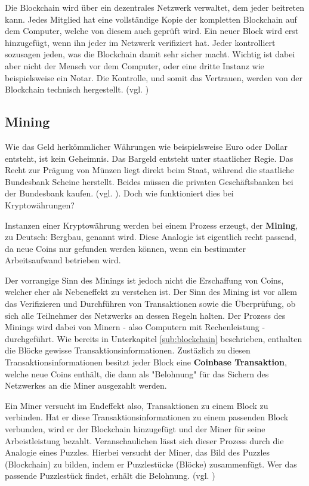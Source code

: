 \documentclass[oneside]{ausarbeitung}
\begin{document}
Die Blockchain wird über ein dezentrales Netzwerk verwaltet, dem
jeder beitreten kann. Jedes Mitglied hat eine vollständige Kopie der
kompletten Blockchain auf dem Computer, welche von diesem auch
geprüft wird. Ein neuer Block wird erst hinzugefügt, wenn ihn jeder
im Netzwerk verifiziert hat. Jeder kontrolliert sozusagen jeden, was
die Blockchain damit sehr sicher macht. Wichtig ist dabei aber nicht
der Mensch vor dem Computer, oder eine dritte Instanz wie
beispielsweise ein Notar. Die Kontrolle, und somit das Vertrauen,
werden von der Blockchain technisch hergestellt. (vgl.
\cite{blockchain})

\subsection{Mining}
\label{sub:mining}

Wie das Geld herkömmlicher Währungen wie beispielsweise Euro oder
Dollar entsteht, ist kein Geheimnis. Das Bargeld entsteht unter
staatlicher Regie. Das Recht zur Prägung von Münzen liegt direkt
beim Staat, während die staatliche Bundesbank Scheine herstellt.
Beides müssen die privaten Geschäftsbanken bei der Bundesbank
kaufen. (vgl. \cite{herstellung_fiat_waehrung}). Doch wie funktioniert
dies bei Kryptowährungen?  

Instanzen einer Kryptowährung werden bei einem Prozess erzeugt, der
\textbf{Mining}, zu Deutsch: Bergbau, genannt wird. Diese Analogie ist
eigentlich recht passend, da neue Coins nur gefunden werden können,
wenn ein bestimmter Arbeitsaufwand betrieben wird.

Der vorrangige Sinn des Minings ist jedoch nicht die Erschaffung von
Coins, welcher eher als Nebeneffekt zu verstehen ist. Der Sinn des
Mining ist vor allem das Verifizieren und Durchführen von
Transaktionen sowie die Überprüfung, ob sich alle Teilnehmer des
Netzwerks an dessen Regeln halten. Der Prozess des Minings wird dabei
von Minern - also Computern mit Rechenleistung - durchgeführt. Wie
bereits in Unterkapitel \ref{sub:blockchain} beschrieben, enthalten
die Blöcke gewisse Transaktionsinformationen. Zustäzlich zu diesen
Transaktionsinformationen besitzt jeder Block eine \textbf{Coinbase
Transaktion}, welche neue Coins enthält, die dann als "Belohnung"
für das Sichern des Netzwerkes an die Miner ausgezahlt werden.  

Ein Miner versucht im Endeffekt also, Transaktionen zu einem Block zu
verbinden. Hat er diese Transaktionsinformationen zu einem passenden
Block verbunden, wird er der Blockchain hinzugefügt und der Miner
für seine Arbeistleistung bezahlt. Veranschaulichen lässt sich
dieser Prozess durch die Analogie eines Puzzles.  Hierbei versucht der
Miner, das Bild des Puzzles (Blockchain) zu bilden, indem er
Puzzlestücke (Blöcke) zusammenfügt. Wer das passende Puzzlestück
findet, erhält die Belohnung. (vgl. \cite{mining})
\end{document}
